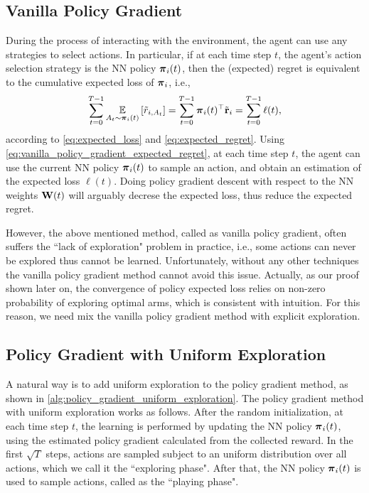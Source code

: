 \subsection{Vanilla Policy Gradient}
\label{subsec:vanilla_policy_gradient}

During the process of interacting with the environment, the agent can use any strategies to select actions. In particular, if at each time step $t$, the agent's action selection strategy is the NN policy ${\boldsymbol{\pi}}_i(t)$, then the (expected) regret is equivalent to the cumulative expected loss of ${\boldsymbol{\pi}}_i$, i.e., 
\begin{equation}
\label{eq:vanilla_policy_gradient_expected_regret}
\begin{split}
    \sum\limits_{t=0}^{T-1}{ \operatorname*{{\mathbb{E}}}\limits_{A_t \sim {\boldsymbol{\pi}}_i(t)} \left[ \tilde{r}_{i, A_t} \right] } = \sum\limits_{t=0}^{T-1}{{\boldsymbol{\pi}}_i(t)^\top {\tilde{\mathbf{r}}}_i} = \sum\limits_{t=0}^{T-1}{\ell(t)},
\end{split}
\end{equation}
according to \cref{eq:expected_loss} and \cref{eq:expected_regret}. Using \cref{eq:vanilla_policy_gradient_expected_regret}, at each time step $t$, the agent can use the current NN policy ${\boldsymbol{\pi}}_i(t)$ to sample an action, and obtain an estimation of the expected loss $\ell(t)$. Doing policy gradient descent with respect to the NN weights ${\mathbf{W}}(t)$ will arguably decrese the expected loss, thus reduce the expected regret. 

However, the above mentioned method, called as vanilla policy gradient, often suffers the ``lack of exploration" problem in practice, i.e., some actions can never be explored thus cannot be learned. Unfortunately, without any other techniques the vanilla policy gradient method cannot avoid this issue. Actually, as our proof shown later on, the convergence of policy expected loss relies on non-zero probability of exploring optimal arms, which is consistent with intuition. For this reason, we need mix the vanilla policy gradient method with explicit exploration.

\subsection{Policy Gradient with Uniform Exploration}

A natural way is to add uniform exploration to the policy gradient method, as shown in \cref{alg:policy_gradient_uniform_exploration}. The policy gradient method with uniform exploration works as follows. After the random initialization, at each time step $t$, the learning is performed by updating the NN policy ${\boldsymbol{\pi}}_i(t)$, using the estimated policy gradient calculated from the collected reward. In the first $\sqrt{T}$ steps, actions are sampled subject to an uniform distribution over all actions, which we call it the ``exploring phase". After that, the NN policy ${\boldsymbol{\pi}}_i(t)$ is used to sample actions, called as the ``playing phase".

